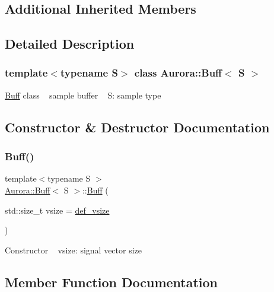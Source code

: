 \subsection*{Additional Inherited Members}


\subsection{Detailed Description}
\subsubsection*{template$<$typename S$>$\newline
class Aurora\+::\+Buff$<$ S $>$}

\hyperlink{class_aurora_1_1_buff}{Buff} class ~\newline
sample buffer ~\newline
S\+: sample type 

\subsection{Constructor \& Destructor Documentation}
\mbox{\label{class_aurora_1_1_buff_aa6a1980c02f6f9e416bbc59905e847ad}} 
\subsubsection{\texorpdfstring{Buff()}{Buff()}}
{\footnotesize\ttfamily template$<$typename S $>$ \\
\hyperlink{class_aurora_1_1_buff}{Aurora\+::\+Buff}$<$ S $>$\+::\hyperlink{class_aurora_1_1_buff}{Buff} (\begin{DoxyParamCaption}\item[{std\+::size\+\_\+t}]{vsize = {\ttfamily \hyperlink{namespace_aurora_afaaddf667a06e7ce23c667a8b7295263}{def\+\_\+vsize}} }\end{DoxyParamCaption})\hspace{0.3cm}{\ttfamily [inline]}}

Constructor ~\newline
vsize\+: signal vector size 

\subsection{Member Function Documentation}
\mbox{\label{class_aurora_1_1_buff_a2f0e8c8310f776585144d0c1567d3e5a}} 
